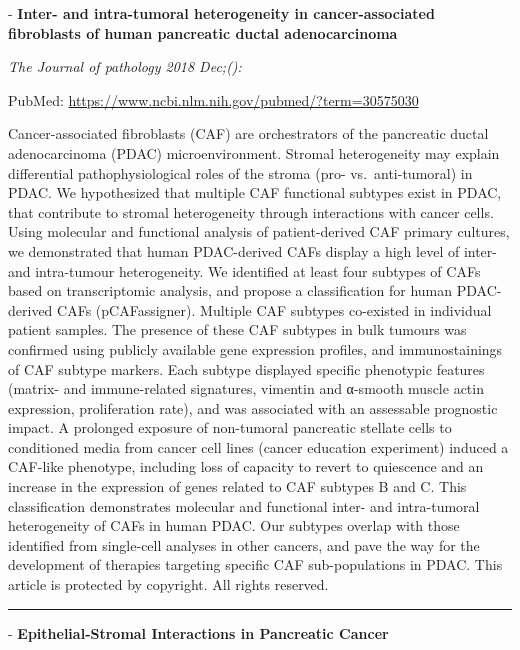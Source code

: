 \documentclass[]{article}
\begin{document}
 - \textbf{Inter- and intra-tumoral heterogeneity in cancer-associated
fibroblasts of human pancreatic ductal adenocarcinoma}

\emph{The Journal of pathology 2018 Dec;():}

PubMed: \url{https://www.ncbi.nlm.nih.gov/pubmed/?term=30575030}

Cancer-associated fibroblasts (CAF) are orchestrators of the pancreatic
ductal adenocarcinoma (PDAC) microenvironment. Stromal heterogeneity may
explain differential pathophysiological roles of the stroma (pro-
vs.~anti-tumoral) in PDAC. We hypothesized that multiple CAF functional
subtypes exist in PDAC, that contribute to stromal heterogeneity through
interactions with cancer cells. Using molecular and functional analysis
of patient-derived CAF primary cultures, we demonstrated that human
PDAC-derived CAFs display a high level of inter- and intra-tumour
heterogeneity. We identified at least four subtypes of CAFs based on
transcriptomic analysis, and propose a classification for human
PDAC-derived CAFs (pCAFassigner). Multiple CAF subtypes co-existed in
individual patient samples. The presence of these CAF subtypes in bulk
tumours was confirmed using publicly available gene expression profiles,
and immunostainings of CAF subtype markers. Each subtype displayed
specific phenotypic features (matrix- and immune-related signatures,
vimentin and α-smooth muscle actin expression, proliferation rate), and
was associated with an assessable prognostic impact. A prolonged
exposure of non-tumoral pancreatic stellate cells to conditioned media
from cancer cell lines (cancer education experiment) induced a CAF-like
phenotype, including loss of capacity to revert to quiescence and an
increase in the expression of genes related to CAF subtypes B and C.
This classification demonstrates molecular and functional inter- and
intra-tumoral heterogeneity of CAFs in human PDAC. Our subtypes overlap
with those identified from single-cell analyses in other cancers, and
pave the way for the development of therapies targeting specific CAF
sub-populations in PDAC. This article is protected by copyright. All
rights reserved.

{}

{}

\begin{center}\rule{0.5\linewidth}{\linethickness}\end{center}

 - \textbf{Epithelial-Stromal Interactions in Pancreatic Cancer}
\end{document}
